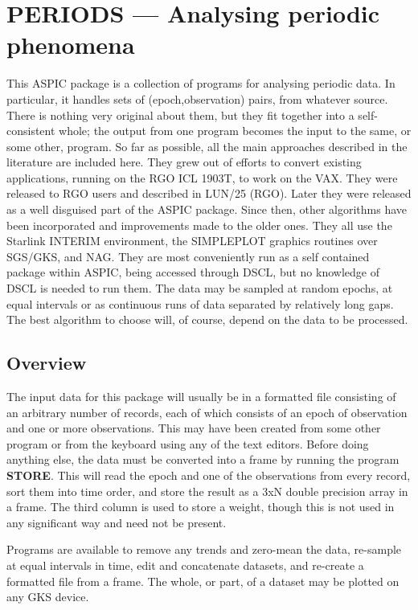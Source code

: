 \section {PERIODS --- Analysing periodic phenomena}

This ASPIC package is a collection of programs for analysing periodic data.
In particular, it handles sets of (epoch,observation) pairs, from whatever
source.
There is nothing very original about them, but they fit together into a
self-consistent whole; the output from one program becomes the input to the
same, or some other, program.
So far as possible, all the main approaches described in the literature are
included here.
They grew out of efforts to convert existing applications, running on the RGO
ICL 1903T, to work on the VAX.
They were released to RGO users and described in LUN/25 (RGO).
Later they were released as a well disguised part of the ASPIC package.
Since then, other algorithms have been incorporated and improvements made to the
older ones.
They all use the Starlink INTERIM environment, the SIMPLEPLOT graphics routines
over SGS/GKS, and NAG.
They are most conveniently run as a self contained package within ASPIC, being
accessed through DSCL, but no knowledge of DSCL is needed to run them.
The data may be sampled at random epochs, at equal intervals or as continuous
runs of data separated by relatively long gaps.
The best algorithm to choose will, of course, depend on the data to be
processed.
\subsection {Overview}
The input data for this package will usually be in a formatted file consisting
of an arbitrary number of records, each of which consists of an epoch of
observation and one or more observations.
This may have been created from some other program or from the keyboard using
any of the text editors.
Before doing anything else, the data must be converted into a frame by
running the program {\bf STORE}.
This will read the epoch and one of the observations from every record, sort
them into time order, and store the result as a 3xN double precision array in
a frame.
The third column is used to store a weight, though this is not used in any
significant way and need not be present.

Programs are available to remove any trends and zero-mean the data, re-sample at
equal intervals in time, edit and concatenate datasets, and re-create a
formatted file from a frame.
The whole, or part, of a dataset may be plotted on any GKS device.

